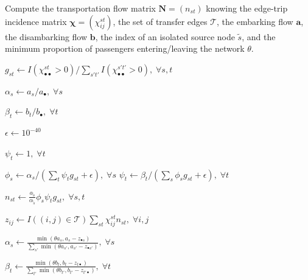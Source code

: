 \documentclass{bmcart}
\begin{document}
\begin{algorithm}[H]
	\caption{Compute the transportation flow matrix $\mathbf{N} = (n_{st})$ knowing the edge-trip incidence matrix $\bm{\chi} = (\chi_{ij}^{st})$, the set of transfer edges $\mathcal{T}$, the embarking flow $\mathbf{a}$, the disambarking flow $\mathbf{b}$, the index of an isolated source node $\tilde{s}$, and the minimum proportion of passengers entering/leaving the network $\theta$.}
	\label{algo1}
	\begin{algorithmic}[1]
		\State $g_{st} \leftarrow I(\chi_{\bullet \bullet}^{st} > 0) / \sum_{s't'}I(\chi_{\bullet \bullet}^{s't'} > 0), \; \forall s,t$ 
		
		\State $\alpha_s \leftarrow a_s / a_\bullet, \; \forall s$ 
		
		\State $\beta_t \leftarrow b_t / b_\bullet, \; \forall t$ 
		
		\State $\epsilon \leftarrow 10^{-40}$ 
		
		 
		
		\State $\psi_t \leftarrow 1, \; \forall t$
		
		 
		
		\State $\phi_s \leftarrow \alpha_s / (\sum_t \psi_t g_{st} + \epsilon), \; \forall s$
		\State $\psi_t \leftarrow \beta_t / (\sum_s \phi_s g_{st} + \epsilon), \; \forall t$
		
		\EndWhile
		
		\State $n_{st} \leftarrow \frac{a_{\tilde{s}}}{\alpha_{\tilde{s}}} \phi_s \psi_t g_{st}, \; \forall s,t$ 
		
		\State $z_{ij} \leftarrow I((i,j) \in \mathcal{T})\sum_{st} \chi_{ij}^{st} n_{st}, \; \forall i,j$
		
		\State $\alpha_s \leftarrow \frac{\min(\theta a_s, a_s - z_{\bullet s})}{\sum_{s'} \min(\theta a_{s'}, a_{s'} - z_{\bullet {s'}})}, \; \forall s$ 
		
		\State $\beta_t \leftarrow \frac{\min(\theta b_t, b_t - z_{t \bullet})}{\sum_{t'} \min(\theta b_{t'}, b_{t'} - z_{{t'} \bullet})}, \; \forall t$ 
		

\end{algorithmic}
\end{algorithm}
\end{document}
